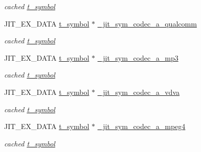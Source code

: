 \begin{DoxyCompactItemize}
\begin{DoxyCompactList}\small\item\em cached \hyperlink{structt__symbol}{t\_\-symbol} \item\end{DoxyCompactList}\item 
\hypertarget{group__jitter_ga907fd7815f1e5d7bd0bf9766cdb5b273}{
JIT\_\-EX\_\-DATA \hyperlink{structt__symbol}{t\_\-symbol} $\ast$ \hyperlink{group__jitter_ga907fd7815f1e5d7bd0bf9766cdb5b273}{\_\-jit\_\-sym\_\-codec\_\-a\_\-qualcomm}}
\label{group__jitter_ga907fd7815f1e5d7bd0bf9766cdb5b273}

\begin{DoxyCompactList}\small\item\em cached \hyperlink{structt__symbol}{t\_\-symbol} \item\end{DoxyCompactList}\item 
\hypertarget{group__jitter_ga16b54a72101138c40b9473e923d213e0}{
JIT\_\-EX\_\-DATA \hyperlink{structt__symbol}{t\_\-symbol} $\ast$ \hyperlink{group__jitter_ga16b54a72101138c40b9473e923d213e0}{\_\-jit\_\-sym\_\-codec\_\-a\_\-mp3}}
\label{group__jitter_ga16b54a72101138c40b9473e923d213e0}

\begin{DoxyCompactList}\small\item\em cached \hyperlink{structt__symbol}{t\_\-symbol} \item\end{DoxyCompactList}\item 
\hypertarget{group__jitter_ga407ca595824d30275dfddd9803ef1e98}{
JIT\_\-EX\_\-DATA \hyperlink{structt__symbol}{t\_\-symbol} $\ast$ \hyperlink{group__jitter_ga407ca595824d30275dfddd9803ef1e98}{\_\-jit\_\-sym\_\-codec\_\-a\_\-vdva}}
\label{group__jitter_ga407ca595824d30275dfddd9803ef1e98}

\begin{DoxyCompactList}\small\item\em cached \hyperlink{structt__symbol}{t\_\-symbol} \item\end{DoxyCompactList}\item 
\hypertarget{group__jitter_gad42107912802e6055e747303fa8498c6}{
JIT\_\-EX\_\-DATA \hyperlink{structt__symbol}{t\_\-symbol} $\ast$ \hyperlink{group__jitter_gad42107912802e6055e747303fa8498c6}{\_\-jit\_\-sym\_\-codec\_\-a\_\-mpeg4}}
\label{group__jitter_gad42107912802e6055e747303fa8498c6}

\begin{DoxyCompactList}\small\item\em cached \hyperlink{structt__symbol}{t\_\-symbol} \item\end{DoxyCompactList}\end{DoxyCompactItemize}
